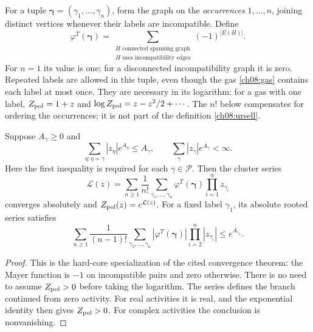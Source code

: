 For a tuple $\boldsymbol\gamma=(\gamma_1,\ldots,\gamma_n)$,
form the graph on the \emph{occurrences} $1,\ldots,n$, joining distinct
vertices whenever their labels are incompatible. Define
\begin{equation}\label{ch08:ursell}
 \varphi^T(\boldsymbol\gamma)=
 \sum_{\substack{H\text{ connected spanning graph}\\
                   H\text{ uses incompatibility edges}}}
                 (-1)^{|E(H)|}.
\end{equation}
For $n=1$ its value is one; for a disconnected incompatibility graph it
is zero. Repeated labels are allowed in this tuple, even though the gas
\eqref{ch08:gas} contains each label at most once. They are necessary in
its logarithm: for a gas with one label, $Z_{\rm pol}=1+z$ and
$\log Z_{\rm pol}=z-z^2/2+\cdots$. The $n!$ below compensates for
ordering the occurrences; it is not part of the definition
\eqref{ch08:ursell}.

\begin{theorem}
\label{ch08:kp}
Suppose $A_\gamma\ge0$ and
\begin{equation}\label{ch08:kp-condition}
 \sum_{\eta:\eta\not\sim\gamma}
       |z_\eta|e^{A_\eta}\le A_\gamma,
 \qquad \sum_\gamma |z_\gamma|e^{A_\gamma}<\infty.
\end{equation}
Here the first inequality is required for each $\gamma\in\mathcal P$.
Then the cluster series
\begin{equation}\label{ch08:log}
 \mathcal L(z)=\sum_{n\ge1}\frac1{n!}
       \sum_{\gamma_1,\ldots,\gamma_n}
        \varphi^T(\boldsymbol\gamma)\prod_{i=1}^n z_{\gamma_i}
\end{equation}
converges absolutely and $Z_{\rm pol}(z)=e^{\mathcal L(z)}$.
For a fixed label $\gamma_1$, its absolute rooted series satisfies
\begin{equation}\label{ch08:root}
 \sum_{n\ge1}\frac1{(n-1)!}
 \sum_{\gamma_2,\ldots,\gamma_n}
 |\varphi^T(\boldsymbol\gamma)|\prod_{i=2}^n|z_{\gamma_i}|
 \le e^{A_{\gamma_1}}.
\end{equation}
\end{theorem}

\begin{proof}
This is the hard-core specialization of the cited convergence theorem:
the Mayer function is $-1$ on incompatible pairs and zero otherwise.
There is no need to assume $Z_{\rm pol}>0$ before taking the logarithm.
The series defines the branch continued from zero activity. For real
activities it is real, and the exponential identity then gives
$Z_{\rm pol}>0$. For complex activities the conclusion is nonvanishing.
\end{proof}

